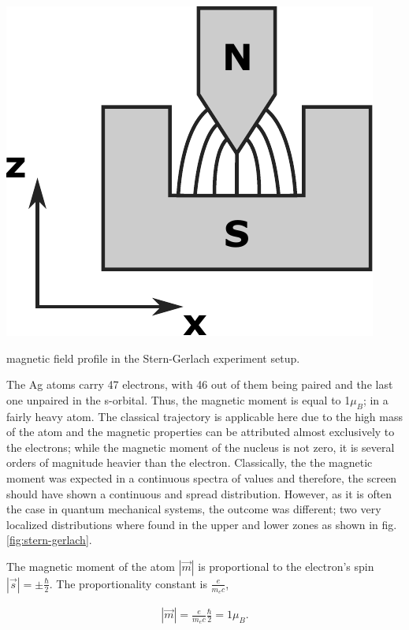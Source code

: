\documentclass{article}
\begin{document}
\begin{marginfigure}%
  \includegraphics[width=\linewidth]{figures/field-profile.pdf}
  \caption{magnetic field profile in the Stern-Gerlach experiment setup.}
  \label{fig:mag-profile}
\end{marginfigure}
The Ag atoms carry 47 electrons, with 46 out of them being paired and the last one unpaired in the s-orbital. Thus, the magnetic moment is equal to 1$\mu_B$; in a fairly heavy atom. The classical trajectory is applicable here due to the high mass of the atom and the magnetic properties can be attributed almost exclusively to the electrons; while the magnetic moment of the nucleus is not zero, it is several orders of magnitude heavier than the electron.
Classically, the the magnetic moment was expected in a continuous spectra of values and therefore, the screen should have shown a continuous and spread distribution. However, as it is often the case in quantum mechanical systems, the outcome was different; two very localized distributions where found in the upper and lower zones as shown in fig. \ref{fig:stern-gerlach}.

The magnetic moment of the atom $\left|\vec{m}\right|$ is proportional to the electron's spin $\left|\vec{s}\right|=\pm\frac{\hbar}{2}$. The proportionality constant is $\frac{e}{m_ec}$, 

\begin{align}\label{eq:magmom}
  \left|\vec{m}\right| = \frac{e}{m_ec}\frac{\hbar}{2} = 1\mu_B.
\end{align}
\end{document}

